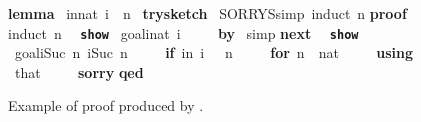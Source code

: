 \documentclass[10pt,conference]{IEEEtran}
\newcommand{\isakwprf}[1]{\textcolor{IsaLightBlue}{\textbf{\texttt{#1}}}}
\newcommand{\isakw}[1]{{\bfseries\ttfamily\def\isachardot{.}\def\isacharunderscore{\isacharunderscorekeyword}%
\def\isacharbraceleft{\{}\def\isacharbraceright{\}}#1}}
\renewcommand{\isacommand}[1]{\textcolor{IsaBlue}{\isakw{#1}}}
\renewcommand{\isakeyword}[1]{\textcolor{IsaGreen}{\isakw{#1}}}
\begin{document}
\begin{figure}
\begin{isabellebody}
\isacommand{lemma}\isamarkupfalse%
\ {\isachardoublequoteopen}{\isacharparenleft}{\kern0pt}{\isasymSum}i{\isasymle}{\isacharparenleft}{\kern0pt}n{\isacharcolon}{\kern0pt}{\isacharcolon}{\kern0pt}nat{\isacharparenright}{\kern0pt}{\isachardot}{\kern0pt}\ {}{\isacharasterisk}{\kern0pt}i{\isacharminus}{\kern0pt}{}{\isacharparenright}{\kern0pt}\ {\isacharequal}{\kern0pt}\ n\ \isanewline
\isacommand{try{\isacharunderscore}{\kern0pt}sketch}\isamarkupfalse%
\ SORRYS{\isacharbrackleft}{\kern0pt}simp{\kern0pt}{\isacharbrackright}{\kern0pt}\ {\isacharparenleft}{\kern0pt}induct\ n{\isacharparenright}{\kern0pt}\isanewline
\isacommand{proof}\isamarkupfalse%
{\isacharparenleft}{\kern0pt}induct\ n{\isacharparenright}{\kern0pt}\isanewline
\ \ \isakwprf{show}\isamarkupfalse%
\ goal{}{\isacharcolon}{\kern0pt}{\isachardoublequoteopen}{\isacharparenleft}{\kern0pt}{\isasymSum}i{\isacharcolon}{\kern0pt}{\isacharcolon}{\kern0pt}nat{\isasymle}{}{\isachardot}{\kern0pt}\ {}{\kern0pt}{\isacharasterisk}{\kern0pt}i{\isacharminus}{\kern0pt}{}{\isacharparenright}{\kern0pt}{\isacharequal}{\kern0pt}{}\isanewline
\ \ \ \ \isacommand{by}\isamarkupfalse%
\ simp\isanewline
\isacommand{next}\isamarkupfalse%
\isanewline
\ \ \isakwprf{show}\isamarkupfalse%
\ goal{}{\isacharcolon}{\kern0pt}{\isachardoublequoteopen}{\isacharparenleft}{\kern0pt}{\isasymSum}i{\isasymle}Suc\ n{\isachardot}{\kern0pt}\ {}{\isacharasterisk}{\kern0pt}i{\isacharminus}{\kern0pt}{}{\isacharparenright}{\kern0pt}{\isacharequal}{\kern0pt}{\isacharparenleft}{\kern0pt}Suc\ n{\isacharparenright}{\kern0pt}\isanewline
\ \ \ \ \isakeyword{if}\ {\isachardoublequoteopen}{\isacharparenleft}{\kern0pt}{\isasymSum}i{\isasymle}n{\isachardot}{\kern0pt}\ {}{\isacharasterisk}{\kern0pt}i{\isacharminus}{\kern0pt}\ {}{\isacharparenright}{\kern0pt}\ {\isacharequal}{\kern0pt}\ n\isanewline
\ \ \ \ \isakeyword{for}\ n\ {\isacharcolon}{\kern0pt}{\isacharcolon}{\kern0pt}\ {\isachardoublequoteopen}nat{\isachardoublequoteclose}\isanewline
\ \ \ \ \isacommand{using}\isamarkupfalse%
\ that\isanewline
\ \ \ \ \isacommand{sorry}\isanewline
\isacommand{qed}
\end{isabellebody}
\caption{Example of proof produced by \trysketch{}.}
\label{fig:trysketchEx}
\end{figure}
\end{document}
